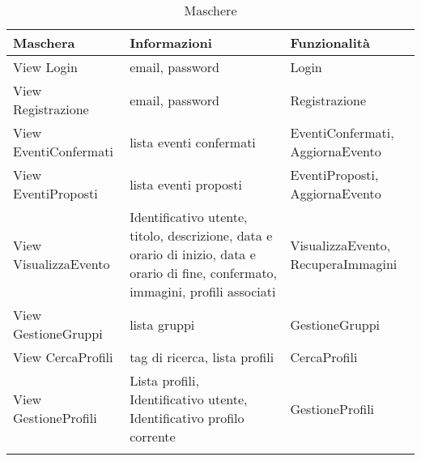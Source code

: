 \begin{longtable} {|P{4.5cm}|P{6.5cm}|P{4cm}|}
    \hline
    \textbf{Maschera}     & \textbf{Informazioni}                                                                                                              & \textbf{Funzionalità}              \\
    \hline
    \endhead
    View Login            & email, password                                                                                                                    & Login                              \\
    \hline
    View Registrazione    & email, password                                                                                                                    & Registrazione                      \\
    \hline
    View EventiConfermati & lista eventi confermati                                                                                                            & EventiConfermati, AggiornaEvento   \\
    \hline
    View EventiProposti   & lista eventi proposti                                                                                                              & EventiProposti, \linebreak AggiornaEvento     \\
    \hline
    View VisualizzaEvento & Identificativo utente, titolo, descrizione, data e orario di inizio, data e orario di fine, confermato, immagini, profili associati & VisualizzaEvento, RecuperaImmagini \\
    \hline
    View GestioneGruppi   & lista gruppi                                                                                                                       & GestioneGruppi                     \\
    \hline
    View CercaProfili     & tag di ricerca, lista profili                                                                                                      & CercaProfili                       \\
    \hline
    View GestioneProfili  & Lista profili, Identificativo utente, Identificativo profilo corrente                                                              & GestioneProfili                    \\
    \hline
\caption{Maschere}
\end{longtable}

\clearpage




